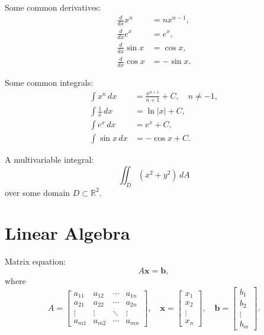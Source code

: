 \documentclass[12pt,a4paper]{article}
\begin{document}
Some common derivatives:
\begin{align}
  \frac{d}{dx} x^n    & = n x^{n-1}, \\
  \frac{d}{dx} e^x    & = e^x,       \\
  \frac{d}{dx} \sin x & = \cos x,    \\
  \frac{d}{dx} \cos x & = -\sin x.
\end{align}

Some common integrals:
\begin{align}
  \int x^n\,dx         & = \frac{x^{n+1}}{n+1} + C, \quad n \neq -1, \\
  \int \frac{1}{x}\,dx & = \ln |x| + C,                              \\
  \int e^x\,dx         & = e^x + C,                                  \\
  \int \sin x\,dx      & = -\cos x + C.
\end{align}

A multivariable integral:
\begin{equation}
  \iint_{D} (x^2 + y^2)\,dA
\end{equation}
over some domain $D \subset \mathbb{R}^2$.

\section{Linear Algebra}

Matrix equation:
\begin{equation}
  A \mathbf{x} = \mathbf{b},
\end{equation}
where
\begin{equation}
  A =
  \begin{bmatrix}
    a_{11} & a_{12} & \cdots & a_{1n} \\
    a_{21} & a_{22} & \cdots & a_{2n} \\
    \vdots & \vdots & \ddots & \vdots \\
    a_{m1} & a_{m2} & \cdots & a_{mn}
  \end{bmatrix},
  \quad
  \mathbf{x} =
  \begin{bmatrix}
    x_1 \\ x_2 \\ \vdots \\ x_n
  \end{bmatrix},
  \quad
  \mathbf{b} =
  \begin{bmatrix}
    b_1 \\ b_2 \\ \vdots \\ b_m
  \end{bmatrix}.
\end{equation}
\end{document}
